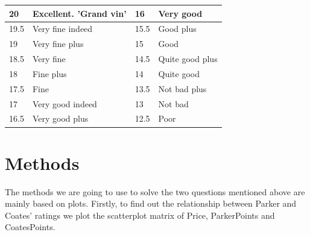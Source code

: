 \documentclass[11pt]{article}
\begin{document}
\begin{table}[h]
\begin{tabular}{|l|l|l|l|}
\hline
20   & Excellent. ’Grand vin’ & 16   & Very good       \\ \hline
19.5 & Very fine indeed       & 15.5 & Good plus       \\ \hline
19   & Very fine plus         & 15   & Good            \\ \hline
18.5 & Very fine              & 14.5 & Quite good plus \\ \hline
18   & Fine plus              & 14   & Quite good      \\ \hline
17.5 & Fine                   & 13.5 & Not bad plus    \\ \hline
17   & Very good indeed       & 13   & Not bad         \\ \hline
16.5 & Very good plus         & 12.5 & Poor            \\ \hline
\end{tabular}
\end{table}

\section{Methods}
The methods we are going to use to solve the two questions mentioned above are mainly based on plots.
Firstly, to find out the relationship between Parker and Coates' ratings we plot the scatterplot matrix of Price, ParkerPoints and CoatesPoints.
\end{document}
